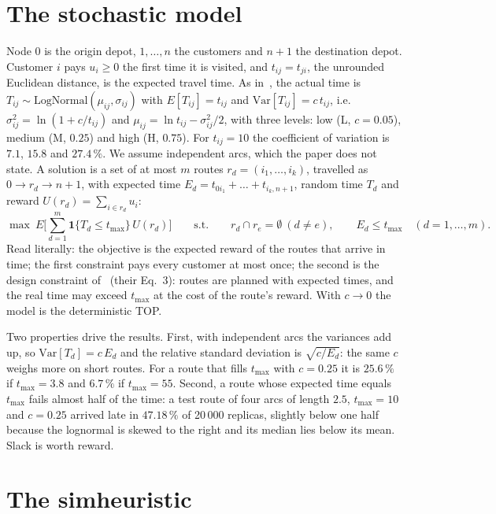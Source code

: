 \documentclass[10pt,a4paper]{article}
\begin{document}
\section{The stochastic model}
\label{sec:model}

Node $0$ is the origin depot, $1,\dots,n$ the customers and $n+1$ the destination depot. Customer $i$
pays $u_i\ge0$ the first time it is visited, and $t_{ij}=t_{ji}$, the unrounded Euclidean distance, is
the expected travel time. As in~\cite{juan2019}, the actual time is
$T_{ij}\sim\text{LogNormal}(\mu_{ij},\sigma_{ij})$ with $E[T_{ij}]=t_{ij}$ and
$\text{Var}[T_{ij}]=c\,t_{ij}$, i.e.\ $\sigma_{ij}^2=\ln(1+c/t_{ij})$ and
$\mu_{ij}=\ln t_{ij}-\sigma_{ij}^2/2$, with three levels: low (L, $c=0.05$), medium (M, $0.25$) and high
(H, $0.75$). For $t_{ij}=10$ the coefficient of variation is $7.1$, $15.8$ and $27.4\,\%$. We assume
independent arcs, which the paper does not state. A solution is a set of at most $m$ routes
$r_d=(i_1,\dots,i_k)$, travelled as $0\to r_d\to n+1$, with expected time
$E_d=t_{0i_1}+\dots+t_{i_k,n+1}$, random time $T_d$ and reward $U(r_d)=\sum_{i\in r_d}u_i$:
\begin{equation}
\max\ E\Big[\sum_{d=1}^{m}\mathbf 1\{T_d\le t_{\max}\}\,U(r_d)\Big]
\qquad\text{s.t.}\qquad
r_d\cap r_e=\emptyset\ (d\neq e),\qquad
E_d\le t_{\max}\quad (d=1,\dots,m).
\label{eq:model}
\end{equation}
Read literally: the objective is the expected reward of the routes that arrive in time; the first
constraint pays every customer at most once; the second is the design constraint of~\cite{juan2019}
(their Eq.~3): routes are planned with expected times, and the real time may exceed $t_{\max}$ at the
cost of the route's reward. With $c\to0$ the model is the deterministic TOP.

Two properties drive the results. First, with independent arcs the variances add up, so
$\text{Var}[T_d]=c\,E_d$ and the relative standard deviation is $\sqrt{c/E_d}$: the same $c$ weighs more
on short routes. For a route that fills $t_{\max}$ with $c=0.25$ it is $25.6\,\%$ if $t_{\max}=3.8$ and
$6.7\,\%$ if $t_{\max}=55$. Second, a route whose expected time equals $t_{\max}$ fails almost half of the
time: a test route of four arcs of length $2.5$, $t_{\max}=10$ and $c=0.25$ arrived late in
$47.18\,\%$ of 20\,000 replicas, slightly below one half because the lognormal is skewed to the right
and its median lies below its mean. Slack is worth reward.

\section{The simheuristic}
\label{sec:method}
\end{document}
